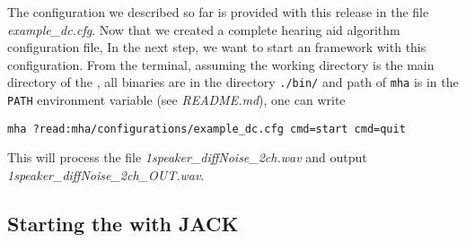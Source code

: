 The configuration we described so far is provided with this release 
in the file \emph{example\_dc.cfg}. Now that we created a complete \mha{} hearing aid
algorithm configuration file, In the next step, we want to start an \mha{}
framework with this configuration.
%
From the terminal, assuming the working directory is the main 
directory of the \mha{}, all binaries are in the directory \verb!./bin/! 
and path of \verb!mha! is in the \verb!PATH! environment variable 
(see \emph{README.md}),  one can write
\begin{verbatim}
mha ?read:mha/configurations/example_dc.cfg cmd=start cmd=quit
\end{verbatim}
%
This will process the file \emph{1speaker\_diffNoise\_2ch.wav} and output 
\emph{1speaker\_diffNoise\_2ch\_OUT.wav}.


\subsection{Starting the \mhad{} with JACK}%
\label{sec:example_jack}%
%
%
%

